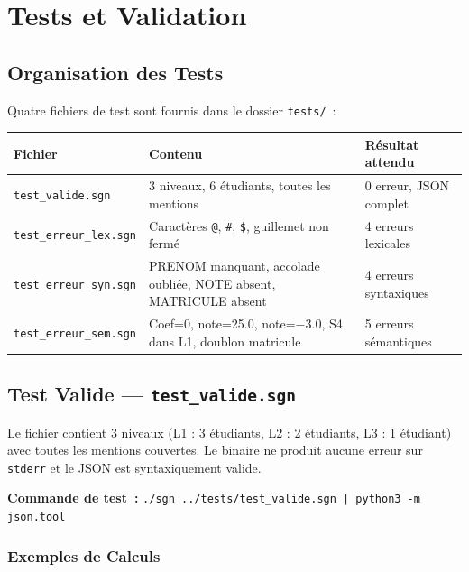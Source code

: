 \documentclass[a4paper,12pt]{article}
\newenvironment{remarque}{%
  \begin{tcolorbox}[
    colback=alertbg,
    colframe=alertborder,
    leftrule=4pt, rightrule=0pt, toprule=0pt, bottomrule=0pt,
    arc=0pt, outer arc=0pt,
    boxsep=4pt, left=6pt, right=6pt, top=4pt, bottom=4pt,
  ]
  \small\itshape
}{%
  \end{tcolorbox}
}
\begin{document}
\section{Tests et Validation}

\subsection{Organisation des Tests}

Quatre fichiers de test sont fournis dans le dossier \texttt{tests/}~:

\begin{center}
\begin{tabular}{lll}
\toprule
\textbf{Fichier} & \textbf{Contenu} & \textbf{Résultat attendu} \\
\midrule
\texttt{test\_valide.sgn}      & 3 niveaux, 6 étudiants, toutes les mentions & 0 erreur, JSON complet \\
\texttt{test\_erreur\_lex.sgn} & Caractères \texttt{@}, \texttt{\#}, \texttt{\$}, guillemet non fermé & 4 erreurs lexicales \\
\texttt{test\_erreur\_syn.sgn} & PRENOM manquant, accolade oubliée, NOTE absent, MATRICULE absent & 4 erreurs syntaxiques \\
\texttt{test\_erreur\_sem.sgn} & Coef=0, note=25.0, note=$-3.0$, S4 dans L1, doublon matricule & 5 erreurs sémantiques \\
\bottomrule
\end{tabular}
\end{center}

\subsection{Test Valide — \texttt{test\_valide.sgn}}

Le fichier contient 3 niveaux (L1 : 3 étudiants, L2 : 2 étudiants, L3 : 1 étudiant) avec toutes les mentions couvertes. Le binaire ne produit aucune erreur sur \texttt{stderr} et le JSON est syntaxiquement valide.

\begin{remarque}
\textbf{Commande de test~:}
\texttt{./sgn ../tests/test\_valide.sgn | python3 -m json.tool}
\end{remarque}

\subsubsection{Exemples de Calculs}
\end{document}
